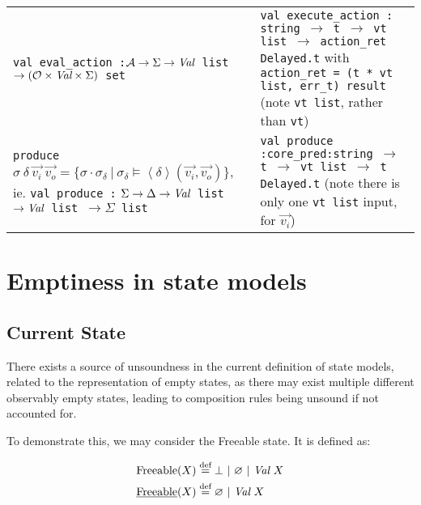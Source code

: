 \documentclass[,a4paper,oneside]{article}
\newcommand{\code}[1]{\texttt{#1}}
\newcommand{\defeq}{\stackrel{\text{def}}=}
\newcommand{\rarr}{\ensuremath{\rightarrow}}
\begin{document}
\begin{tabularx}{\textwidth}{X|X}
	\thead{\bfseries Theory} & \thead{\bfseries Gillian} \\ \hline\hline
\code{val eval\_action :\newline ${\cal A}\rarr\Sigma\rarr \textrm{\it Val}$ list $\rarr ({\cal O}\times \textrm{\it Val} \times \Sigma)$ set}
	& \small\code{val execute\_action :\newline
    string $\rarr$ t $\rarr$ vt list $\rarr$ action\_ret Delayed.t}
    with \code{action\_ret = (t * vt list, err\_t) result} (note \code{vt list}, rather than \code{vt})
    \\\hline
    \code{produce }$\sigma ~\delta ~\vec{v_i}~\vec{v_o} = \{ \sigma\cdot\sigma_\delta ~|~\sigma_\delta \vDash \left<\delta\right> (\vec{v_i}, \vec{v_o}) \}$, ie.\newline
    \small\code{val produce :}\newline
    \code{$\Sigma\rarr\Delta \rarr \textrm{\it Val}$ list $\rarr \textrm{\it Val}$ list $\rarr \Sigma$ list}
    & \small\code{val produce :\newline core\_pred:string $\rarr$ t $\rarr$ vt list $\rarr$ t Delayed.t} (note there is only one \code{vt list} input, for $\vec{v_i}$)
    
\end{tabularx}

\clearpage

\section{Emptiness in state models}

\subsection{Current State}

There exists a source of unsoundness in the current definition of state models, related to the representation of empty states, as there may exist multiple different observably empty states, leading to composition rules being unsound if not accounted for.

To demonstrate this, we may consider the Freeable state. It is defined as:

\newcommand{\val}[0]{\textit{Val}~}

\begin{align*}
	\text{Freeable}(X) &\defeq \bot ~|~ \varnothing ~|~ \val X\\
	\text{\underline{Freeable}}(X) &\defeq \varnothing ~|~\val X
\end{align*}
\end{document}

